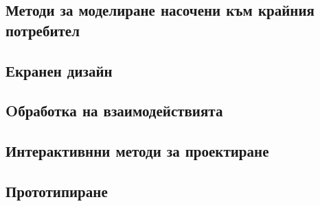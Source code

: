 \documentclass[fleqn,12pt]{article}
\begin{document}
\subsection{Методи за моделиране насочени  към  крайния  потребител}
\subsection{Екранен  дизайн}
\subsection{Oбработка  на взаимодействията}
\subsection{Интерактивнни методи за проектиране}
\subsection{Прототипиране}
\end{document}
